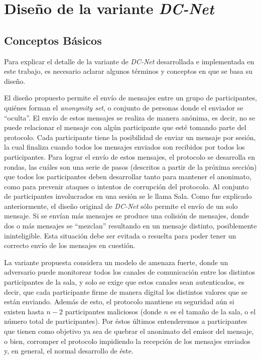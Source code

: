 \chapter{Diseño de la variante \emph{DC-Net}}\label{cap3}

\section{Conceptos Básicos}

Para explicar el detalle de la variante de \emph{DC-Net} desarrollada e 
implementada en este trabajo, es necesario aclarar algunos términos y 
conceptos en que se basa su diseño.

El diseño propuesto permite el envío de mensajes entre un grupo de 
participantes, quiénes forman el \emph{anonymity set}, o conjunto de personas 
donde el enviador se ``oculta''. El envío de estos 
mensajes se realiza de manera anónima, es decir, no se puede relacionar el 
mensaje con algún participante que esté tomando parte del protocolo. Cada 
participante tiene la posibilidad de enviar un mensaje por sesión, la cual 
finaliza cuando todos los mensajes enviados son 
recibidos por todos los participantes. Para lograr el envío de estos mensajes, 
el protocolo se desarrolla en rondas, las cuáles son una serie de pasos 
(descritos a partir de la próxima sección) que todos los participantes deben 
desarrollar tanto para mantener el anonimato, como para prevenir ataques o intentos 
de corrupción del protocolo. Al conjunto de 
participantes involucrados en una sesión se le llama Sala. Como fue explicado 
anteriormente, el diseño original de \emph{DC-Net} sólo permite el envío de un 
solo mensaje. Si se envían más mensajes se produce una colisión de mensajes,  
donde dos o más mensajes se
``mezclan'' resultando en un mensaje distinto, posiblemente
ininteligible. Esta situación debe ser evitada o resuelta para poder
tener un correcto envío de los mensajes en cuestión.

La variante propuesta considera un modelo de amenaza fuerte, donde un 
adversario puede monitorear todos los canales de 
comunicación entre los distintos participantes de la sala, y solo se exige que 
estos canales sean autenticados, es decir, que cada participante firme de 
manera digital los distintos valores que se están enviando. Además de esto, el 
protocolo mantiene su seguridad aún si existen hasta $n-2$ participantes maliciosos 
(donde $n$ es el tamaño de la 
sala, o el número total de participantes). Por éstos últimos entenderemos a 
participantes que tienen como objetivo ya sea de quebrar el anonimato del 
emisor del mensaje, o bien, corromper el protocolo impidiendo la recepción de 
los mensajes enviados y, en general, el normal desarrollo de éste.


